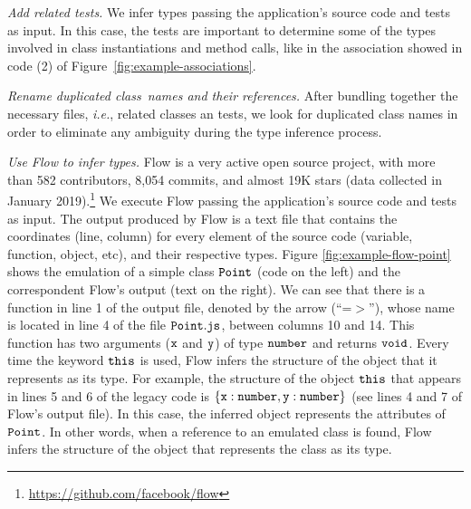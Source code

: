 \documentclass[review]{elsarticle}
\newcommand{\aspas}[1]{{``#1''}}
\newcommand{\mcode}[1]{$\tt #1$}
\begin{document}
\vspace{2.5 mm}

\noindent \textit{Add related tests.} We infer types passing the application's source code and tests as input. In this case, the tests are important to determine some of the types involved in class instantiations and method calls, like in the association showed in code (2) of Figure~\ref{fig:example-associations}.

\vspace{2.5 mm}

\noindent \textit{Rename duplicated class names and their references.} After bundling together the necessary files, \emph{i.e.}, related classes an tests, we look for duplicated class names in order to eliminate any ambiguity during the type inference process.  

\vspace{2.5 mm}

\noindent \textit{Use Flow to infer types.} Flow is a very active open source project, with more than 582 contributors, 8,054 commits, and almost 19K stars (data collected in January 2019).\footnote{\url{https://github.com/facebook/flow}} We execute Flow passing the application's source code and tests as input. The output produced by Flow is a text file that contains the coordinates (line, column) for every element of the source code (variable, function, object, etc), and their respective types. Figure \ref{fig:example-flow-point} shows the emulation of a simple class \mcode{Point} (code on the left) and the correspondent Flow's output (text on the right). We can see that there is a function in line 1 of the output file, denoted by the arrow (\aspas{=$>$}), whose name is located in line 4 of the file \mcode{Point.js}, between columns 10 and 14. This function has two arguments (\mcode{x} and \mcode{y}) of type \mcode{number} and returns \mcode{void}. Every time the keyword \mcode{this} is used, Flow infers the structure of the object that it represents as its type. For example, the structure of the object \mcode{this} that appears in lines 5 and 6 of the legacy code is \mcode{\{x:number, y:number\}} (see lines 4 and 7 of Flow's output file). In this case, the inferred object represents the attributes of \mcode{Point}. In other words, when a reference to an emulated class is found, Flow infers the structure of the object that represents the class as its type. 
\end{document}
